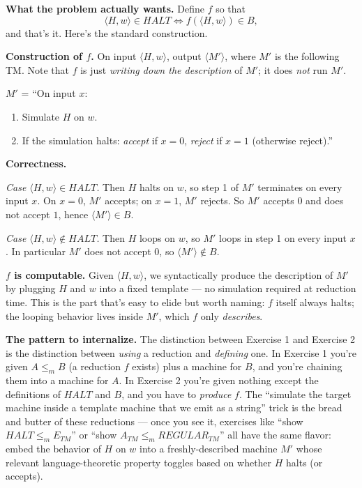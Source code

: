\documentclass[11pt]{article}
\begin{document}
\begin{enumerate}[label=\textbf{Exercise \arabic{*}}]
        \medskip

        \textbf{What the problem actually wants.} Define $f$ so that
        \[
          \langle H, w \rangle \in HALT \iff f(\langle H, w \rangle) \in B,
        \]
        and that's it. Here's the standard construction.

        \medskip

        \textbf{Construction of $f$.} On input $\langle H, w \rangle$, output $\langle M' \rangle$, where $M'$ is the following TM. Note that $f$ is just \emph{writing down the description} of $M'$; it does \emph{not} run $M'$.

        $M'$ = ``On input $x$:
        \begin{enumerate}
          \item Simulate $H$ on $w$.
          \item If the simulation halts: \emph{accept} if $x = 0$, \emph{reject} if $x = 1$ (otherwise reject).''
        \end{enumerate}

        \medskip

        \textbf{Correctness.}

        \emph{Case $\langle H, w \rangle \in HALT$.} Then $H$ halts on $w$, so step 1 of $M'$ terminates on every input $x$. On $x = 0$, $M'$ accepts; on $x = 1$, $M'$ rejects. So $M'$ accepts $0$ and does not accept $1$, hence $\langle M' \rangle \in B$. \checkmark

        \emph{Case $\langle H, w \rangle \notin HALT$.} Then $H$ loops on $w$, so $M'$ loops in step 1 on every input $x$. In particular $M'$ does not accept $0$, so $\langle M' \rangle \notin B$. \checkmark

        \medskip

        \textbf{$f$ is computable.} Given $\langle H, w \rangle$, we syntactically produce the description of $M'$ by plugging $H$ and $w$ into a fixed template --- no simulation required at reduction time. This is the part that's easy to elide but worth naming: $f$ itself always halts; the looping behavior lives inside $M'$, which $f$ only \emph{describes}.

        \medskip

        \textbf{The pattern to internalize.} The distinction between Exercise 1 and Exercise 2 is the distinction between \emph{using} a reduction and \emph{defining} one. In Exercise 1 you're given $A \le_m B$ (a reduction $f$ exists) plus a machine for $B$, and you're chaining them into a machine for $A$. In Exercise 2 you're given nothing except the definitions of $HALT$ and $B$, and you have to \emph{produce} $f$. The ``simulate the target machine inside a template machine that we emit as a string'' trick is the bread and butter of these reductions --- once you see it, exercises like ``show $HALT \le_m E_{TM}$'' or ``show $A_{TM} \le_m REGULAR_{TM}$'' all have the same flavor: embed the behavior of $H$ on $w$ into a freshly-described machine $M'$ whose relevant language-theoretic property toggles based on whether $H$ halts (or accepts).


\end{enumerate}
\end{document}
